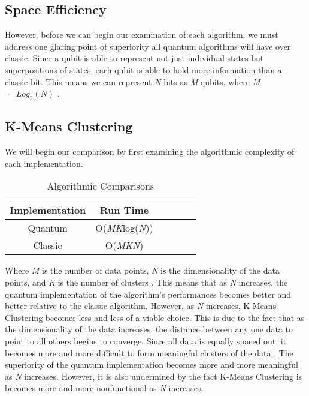 \documentclass[conference]{IEEEtran}
\begin{document}
\subsection{Space Efficiency}
However, before we can begin our examination of each algorithm, we must address one glaring point of superiority all quantum algorithms will have over classic. Since a qubit is able to represent not just individual states but superpositions of states, each qubit is able to hold more information than a classic bit. This means we can represent \emph{N} bits as \emph{M} qubits, where \emph{M} $ = Log_2(N)$ \cite{b12}.
\subsection{K-Means Clustering}
We will begin our comparison by first examining the algorithmic complexity of each implementation. 
\begin{table}[H]
\centering
\caption{Algorithmic Comparisons}
\begin{tabular}{|c|c|c|c|c|c|}
\hline
 Implementation & Run Time   \\
\hline
Quantum & O(\emph{MK}log(\emph{N})) \\
\hline
Classic & O(\emph{MKN}) \\
\hline
\end{tabular}
\end{table}
Where \emph{M} is the number of data points, \emph{N} is the dimensionality of the data points, and \emph{K} is the number of clusters \cite{b6}. This means that as \emph{N} increases, the quantum implementation of the algorithm's performances becomes better and better relative to the classic algorithm. However, as \emph{N} increases, K-Means Clustering becomes less and less of a viable choice. This is due to the fact that as the dimensionality of the data increases, the distance between any one data to point to all others begins to converge. Since all data is equally spaced out, it becomes more and more difficult to form meaningful clusters of the data \cite{b15}. The superiority of the quantum implementation becomes more and more meaningful as \emph{N} increases. However, it is also undermined by the fact K-Means Clustering is becomes more and more nonfunctional as \emph{N} increases.  
\end{document}
